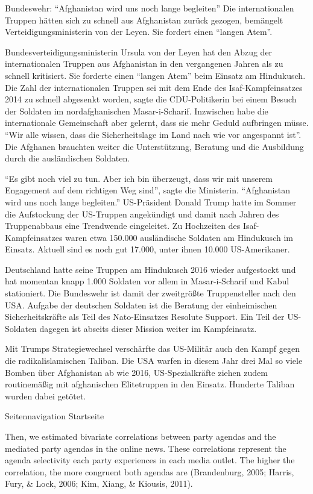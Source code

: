 \documentclass[]{article}
\begin{document}
Bundeswehr: ``Afghanistan wird uns noch lange begleiten'' Die
internationalen Truppen hätten sich zu schnell aus Afghanistan zurück
gezogen, bemängelt Verteidigungsministerin von der Leyen. Sie fordert
einen ``langen Atem''.

Bundesverteidigungsministerin Ursula von der Leyen hat den Abzug der
internationalen Truppen aus Afghanistan in den vergangenen Jahren als zu
schnell kritisiert. Sie forderte einen ``langen Atem'' beim Einsatz am
Hindukusch. Die Zahl der internationalen Truppen sei mit dem Ende des
Isaf-Kampfeinsatzes 2014 zu schnell abgesenkt worden, sagte die
CDU-Politikerin bei einem Besuch der Soldaten im nordafghanischen
Masar-i-Scharif. Inzwischen habe die internationale Gemeinschaft aber
gelernt, dass sie mehr Geduld aufbringen müsse. ``Wir alle wissen, dass
die Sicherheitslage im Land nach wie vor angespannt ist''. Die Afghanen
brauchten weiter die Unterstützung, Beratung und die Ausbildung durch
die ausländischen Soldaten.

``Es gibt noch viel zu tun. Aber ich bin überzeugt, dass wir mit unserem
Engagement auf dem richtigen Weg sind'', sagte die Ministerin.
``Afghanistan wird uns noch lange begleiten.'' US-Präsident Donald Trump
hatte im Sommer die Aufstockung der US-Truppen angekündigt und damit
nach Jahren des Truppenabbaus eine Trendwende eingeleitet. Zu Hochzeiten
des Isaf-Kampfeinsatzes waren etwa 150.000 ausländische Soldaten am
Hindukusch im Einsatz. Aktuell sind es noch gut 17.000, unter ihnen
10.000 US-Amerikaner.

Deutschland hatte seine Truppen am Hindukusch 2016 wieder aufgestockt
und hat momentan knapp 1.000 Soldaten vor allem in Masar-i-Scharif und
Kabul stationiert. Die Bundeswehr ist damit der zweitgrößte
Truppensteller nach den USA. Aufgabe der deutschen Soldaten ist die
Beratung der einheimischen Sicherheitskräfte als Teil des Nato-Einsatzes
Resolute Support. Ein Teil der US-Soldaten dagegen ist abseits dieser
Mission weiter im Kampfeinsatz.

Mit Trumps Strategiewechsel verschärfte das US-Militär auch den Kampf
gegen die radikalislamischen Taliban. Die USA warfen in diesem Jahr drei
Mal so viele Bomben über Afghanistan ab wie 2016, US-Spezialkräfte
ziehen zudem routinemäßig mit afghanischen Elitetruppen in den Einsatz.
Hunderte Taliban wurden dabei getötet.

Seitennavigation Startseite

Then, we estimated bivariate correlations between party agendas and the
mediated party agendas in the online news. These correlations represent
the agenda selectivity each party experiences in each media outlet. The
higher the correlation, the more congruent both agendas are
(Brandenburg, 2005; Harris, Fury, \& Lock, 2006; Kim, Xiang, \& Kiousis,
2011).
\end{document}
